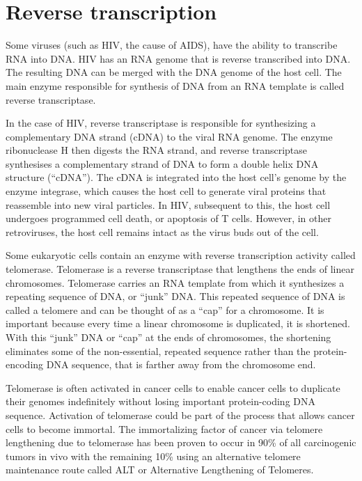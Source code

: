 \hypertarget{reverse-transcription}{%
\section{Reverse transcription}\label{reverse-transcription}}

Some viruses (such as HIV, the cause of AIDS), have the ability to transcribe RNA into DNA. HIV has an RNA genome that is reverse transcribed into DNA. The resulting DNA can be merged with the DNA genome of the host cell. The main enzyme responsible for synthesis of DNA from an RNA template is called reverse transcriptase.

In the case of HIV, reverse transcriptase is responsible for synthesizing a complementary DNA strand (cDNA) to the viral RNA genome. The enzyme ribonuclease H then digests the RNA strand, and reverse transcriptase synthesises a complementary strand of DNA to form a double helix DNA structure (``cDNA''). The cDNA is integrated into the host cell's genome by the enzyme integrase, which causes the host cell to generate viral proteins that reassemble into new viral particles. In HIV, subsequent to this, the host cell undergoes programmed cell death, or apoptosis of T cells. However, in other retroviruses, the host cell remains intact as the virus buds out of the cell.

Some eukaryotic cells contain an enzyme with reverse transcription activity called telomerase. Telomerase is a reverse transcriptase that lengthens the ends of linear chromosomes. Telomerase carries an RNA template from which it synthesizes a repeating sequence of DNA, or ``junk'' DNA. This repeated sequence of DNA is called a telomere and can be thought of as a ``cap'' for a chromosome. It is important because every time a linear chromosome is duplicated, it is shortened. With this ``junk'' DNA or ``cap'' at the ends of chromosomes, the shortening eliminates some of the non-essential, repeated sequence rather than the protein-encoding DNA sequence, that is farther away from the chromosome end.

Telomerase is often activated in cancer cells to enable cancer cells to duplicate their genomes indefinitely without losing important protein-coding DNA sequence. Activation of telomerase could be part of the process that allows cancer cells to become immortal. The immortalizing factor of cancer via telomere lengthening due to telomerase has been proven to occur in 90\% of all carcinogenic tumors in vivo with the remaining 10\% using an alternative telomere maintenance route called ALT or Alternative Lengthening of Telomeres.


